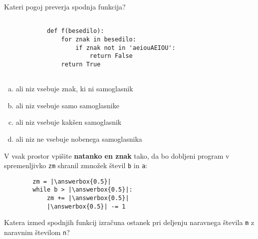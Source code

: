 \documentclass[arhiv, 10pt]{../izpit}
\newcommand{\inlinepy}[1]{\texttt{#1}}
\newcommand{\answerbox}[1]{\framebox{\vphantom{\large M}\hspace{#1cm}}}
\begin{document}
        \naloga*

        \begin{multicols}{2}
        \noindent
        Kateri pogoj preverja spodnja funkcija?
        \begin{verbatim}
        
            def f(besedilo):
                for znak in besedilo:
                    if znak not in 'aeiouAEIOU':
                        return False
                return True
            
        \end{verbatim}

        \begin{enumerate}[(a)]
\item ali niz vsebuje znak, ki ni samoglasnik
\item ali niz vsebuje samo samoglasnike
\item ali niz vsebuje kakšen samoglasnik
\item ali niz ne vsebuje nobenega samoglasnika
\end{enumerate}

        \end{multicols}
    
        \naloga*
        \begin{multicols}{2}
        \noindent
        V vsak prostor vpišite \textbf{natanko en znak} tako, da bo dobljeni program v spremenljivko \inlinepy{zm} shranil zmnožek števil \inlinepy{b} in \inlinepy{a}:
        
        \columnbreak
        \begin{verbatim}
        zm = |\answerbox{0.5}|
        while b > |\answerbox{0.5}|:
            zm += |\answerbox{0.5}|
            |\answerbox{0.5}| -= 1
        \end{verbatim}
        \end{multicols}
    
        \clearpage
        \naloga
        
        Katera izmed spodnjih funkcij izračuna ostanek pri deljenju naravnega števila \inlinepy{m} z naravnim številom \inlinepy{n}?
    
\end{document}
